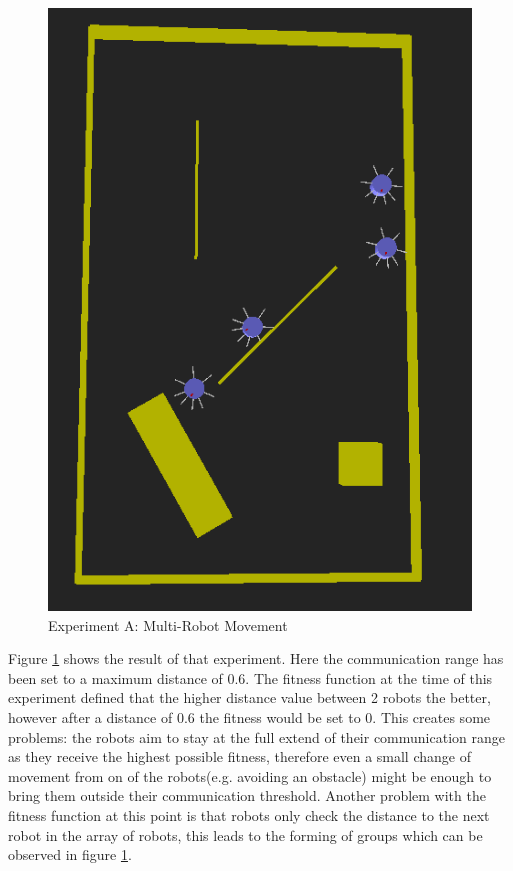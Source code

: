 \begin{figure}[h]
\centering
\includegraphics[scale=0.5]{Chapter4/images/experiment_A.png}
\caption{Experiment A: Multi-Robot Movement}
\label{fig:experiment_a}
\end{figure}

Figure \ref{fig:experiment_a} shows the result of that experiment. 
Here the communication range has been set to a maximum distance of 0.6. 
The fitness function at the time of this experiment defined that the higher distance value between 2 robots the better, however after a distance of 0.6 the fitness would be set to 0.
This creates some problems: the robots aim to stay at the full extend of their communication range as they receive the highest possible fitness, therefore even a small change of movement from on of the robots(e.g. avoiding an obstacle) might be enough to bring them outside their communication threshold. 
Another problem with the fitness function at this point is that robots only check the distance to the next robot in the array of robots, this leads to the forming of groups which can be observed in figure \ref{fig:experiment_a}. \\

